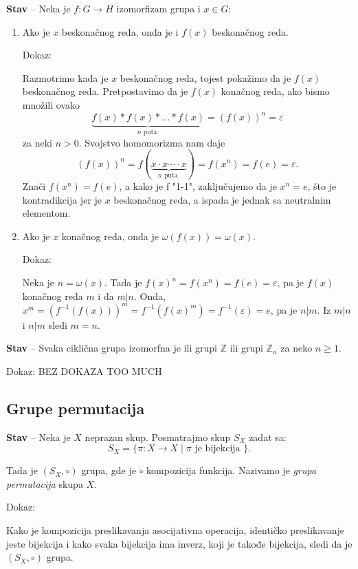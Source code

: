 \documentclass[a4paper,12pt]{article}
\newcommand{\f}[1]{\(#1\)}
\begin{document}
\textbf{Stav} -- Neka je \f{f: G \rightarrow H} izomorfizam grupa i \f{x \in G}:
  \begin{enumerate}
  \item Ako je \f{x} beskonačnog reda, onda je i \f{f(x)} beskonačnog reda.
  
  Dokaz:

  Razmotrimo kada je \f{x} beskonačnog reda, tojest pokažimo da je \f{f(x)} beskonačnog reda.
  Pretpostavimo da je \f{f(x)} konačnog reda, ako bismo množili ovako 
  \[ 
  \underbrace{f(x)*f(x)*\dots*f(x)}_{n \text{ puta }} = (f(x))^n = \varepsilon
  \] za neki \f{n > 0}. Svojstvo homomorizma nam daje 
  \[
  (f(x))^n = f(\underbrace{x \cdot x \cdots \cdot x}_{n \text{ puta }}) = f(x^n) = f(e) = \varepsilon.
  \]
  Znači \f{f(x^n)=f(e)}, a kako je f "1-1", zaključujemo da je \f{x^n = e}, što je kontradikcija jer je \f{x} beskonačnog reda, a ispada je jednak sa neutralnim elementom.
  \item Ako je \f{x} konačnog reda, onda je \f{\omega(f(x)) = \omega(x)}.
  
  Dokaz:

  Neka je \f{n = \omega(x)}. Tada je \f{f(x)^n = f(x^n) = f(e) = \varepsilon}, pa je \f{f(x)} konačnog reda $m$ i da
  \f{m | n}. Onda, \f{x^m = (f^{-1}(f(x)))^m = f^{-1}(f(x)^m) = f^{-1}(\varepsilon) = e}, pa je \f{n | m}.
  Iz \f{m | n} i \f{n | m} sledi \f{m = n}.
  \end{enumerate}


  \textbf{Stav} -- Svaka ciklična grupa izomorfna je ili grupi \f{\mathbb{Z}} ili grupi \f{\mathbb{Z}_n} za neko \f{n \geq 1}.

  Dokaz:
  BEZ DOKAZA TOO MUCH

  \subsection{Grupe permutacija}

  \textbf{Stav} -- Neka je \f{X} neprazan skup. Posmatrajmo skup \f{S_X} zadat sa:
  \[
  S_X = \{ \pi: X \rightarrow X \mid \pi \text{ je bijekcija } \}.
  \]

  Tada je \f{(S_X, \circ)} grupa, gde je \f{\circ} kompozicija funkcija. Nazivamo je \emph{grupa permutacija} skupa \f{X}.

  Dokaz:

  Kako je kompozicija preslikavanja asocijativna operacija, identičko preslikavanje jeste bijekcija i kako svaka
  bijekcija ima inverz, koji je takođe bijekcija, sledi da je \f{(S_X, \circ)} grupa.
\end{document}
